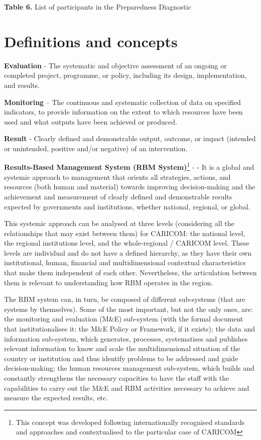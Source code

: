 \documentclass[
  10pt,
]{book}
\begin{document}
\textbf{Table 6.} List of participants in the Preparedness Diagnostic

\hypertarget{definitions-and-concepts}{%
\chapter*{Definitions and concepts}\label{definitions-and-concepts}}

\textbf{Evaluation} - The systematic and objective assessment of an ongoing or completed project, programme, or policy, including its design, implementation, and results.

\textbf{Monitoring} -- The continuous and systematic collection of data on specified indicators, to provide information on the extent to which resources have been used and what outputs have been achieved or produced.

\textbf{Result} - Clearly defined and demonstrable output, outcome, or impact (intended or unintended, positive and/or negative) of an intervention.

\textbf{Results-Based Management System (RBM System)}\footnote{This concept was developed following internationally recognised standards and approaches and contextualised to the particular case of CARICOM} - - It is a global and systemic approach to management that orients all strategies, actions, and resources (both human and material) towards improving decision-making and the achievement and measurement of clearly defined and demonstrable results expected by governments and institutions, whether national, regional, or global.

This systemic approach can be analysed at three levels (considering all the relationships that may exist between them) for CARICOM: the national level, the regional institutions level, and the whole-regional / CARICOM level. These levels are individual and do not have a defined hierarchy, as they have their own institutional, human, financial and multidimensional contextual characteristics that make them independent of each other. Nevertheless, the articulation between them is relevant to understanding how RBM operates in the region.

The RBM system can, in turn, be composed of different sub-systems (that are systems by themselves). Some of the most important, but not the only ones, are: the monitoring and evaluation (M\&E) sub-system (with the formal document that institutionalises it: the M\&E Policy or Framework, if it exists); the data and information sub-system, which generates, processes, systematises and publishes relevant information to know and scale the multidimensional situation of the country or institution and thus identify problems to be addressed and guide decision-making; the human resources management sub-system, which builds and constantly strengthens the necessary capacities to have the staff with the capabilities to carry out the M\&E and RBM activities necessary to achieve and measure the expected results, etc.
\end{document}
